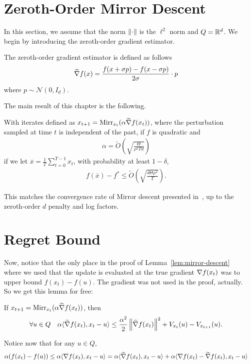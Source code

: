     \section{Zeroth-Order Mirror Descent}
    In this section, we assume that the norm $\left\lVert \cdot \right\rVert$ is the $\ell^2$ norm and $Q = \mathbb{R}^d$. We begin by introducing the zeroth-order gradient estimator.
    \begin{definition}
        The zeroth-order gradient estimator is defined as follows
        \begin{align*}
            \widetilde{\nabla} f(x) = \frac{f(x+\sigma p) - f(x-\sigma p)}{2\sigma} \cdot p
        \end{align*}
        where $p \sim \mathcal N(0,I_d)$. 
    \end{definition}
    The main result of this chapter is the following.
    \begin{theorem}[informal]
        With iterates defined as $x_{t+1} = \mathrm{Mirr}_{x_t}(\alpha \widetilde {\nabla} f(x_t))$, where the perturbation sampled at time $t$ is independent of the past, if $f$ is quadratic and
        \begin{align*}
            \alpha = \widetilde{O}\left(\sqrt{\frac{\Theta}{\rho^2 T d}}\right)
        \end{align*}
        if we let $\overline x = \frac{1}{T} \sum_{t=0}^{T-1} x_t$, with probability at least $1-\delta$, 
        \begin{align*}
            f(\overline x) - f^* \leq \widetilde{O}\left(\sqrt{\frac{d\Theta \rho^2}{T}}\right).
        \end{align*}
    \end{theorem}
    This matches the convergence rate of Mirror descent presented in~\cite{allenZhu2016linear}, up to the zeroth-order $d$ penalty and log factors.

    \section{Regret Bound}
    Now, notice that the only place in the proof of Lemma~\ref{lem:mirror-descent} where we used that the update is evaluated at the true gradient $\nabla f(x_t)$ was to upper bound $f(x_t) - f(u)$. The gradient was not used in the proof, actually. So we get this lemma for free:
    \begin{lemma}
        If $x_{t+1} = \mathrm{Mirr}_{x_t}(\alpha \widetilde{\nabla} f(x_t))$, then
        \begin{align*}
         \forall u \in Q \quad \alpha \langle \widetilde{\nabla} f(x_t), x_t-u \rangle \leq \frac{\alpha^2}{2} \left\lVert \widetilde{\nabla} f(x_t) \right\rVert^2 + V_{x_t}(u) - V_{x_{t+1}}(u).
        \end{align*}
    \end{lemma}
    Notice now that for any $u \in Q$, 
    \begin{align*}
        \alpha (f(x_t) - f(u)) \leq \alpha \langle \nabla f(x_t), x_t - u \rangle  = \alpha \langle \widetilde{\nabla} f(x_t), x_t - u \rangle + \alpha \langle \nabla f(x_t) - \widetilde{\nabla} f(x_t), x_t - u \rangle  
    \end{align*}
    
